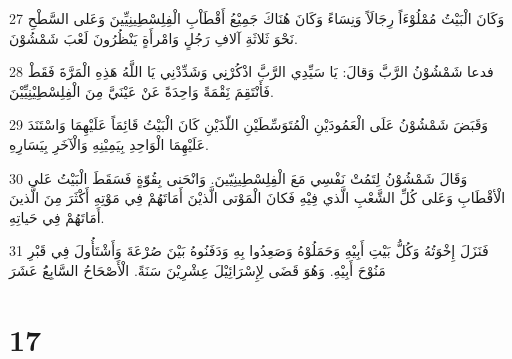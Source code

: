 \par 27 وَكَانَ الْبَيْتُ مُمْلُوْءَاً رِجَالَاً وَنِسَاءً وَكَانَ هُنَاكَ جَمِيْعُ أَقْطَاْبِ الْفِلِسْطِينِيِّينَ وَعَلى السَّطْحِ نَحْوَ ثَلاثَةِ آلافِ رَجُلٍ وَامْرأَةٍ يَنْظُرُونَ لَعْبَ شَمْشُوْنَ.
\par 28 فدعا شَمْشُوْنُ الرَّبَّ وَقالَ: يَا سَيِّدِي الرَّبَّ اذْكُرْنِِي وَشَدِّدْنِي يَا اللَّهُ هَذِهِ الْمَرَّةَ فَقَطْ فَأَنْتَقِمَ نَِقْمَةً وَاحِدَةً عَنْ عَيْنَيَّ مِنَ الْفِلِسْطِيْنِيِّيْنَ.
\par 29 وَقَبَضَ شَمْشُوْنُ عَلَى الْعَمُودَيْنِ الْمُتَوَسِّطَيْنِ اللّذَيْنِ كَانَ الْبَيْتُ قَائِمَاً عَلَيْهِمَا وَاسْتَنَدَ عَلَيْهِمَا الْوَاحِدِ بِيَمِيْنِهِ وَالْآخَرِ بِيَسَارِهِ.
\par 30 وَقَالَ شَمْشُوْنُ لِتَمُتْ نَفْسِي مَعَ الْفِلِسْطِينِيّينَ. وَانْحَنى بِقُوّةٍ فَسَقَطَ الْبَيْتُ عَلى الْأقْطَابِ وَعَلى كُلِّ الشَّعْبِ الَّذي فِيْهِ فَكانَ الْمَوْتى الَّذيْنَ أَمَاتَهُمْ فِي مَوْتِهِ أَكْثَرَ مِنَ الَّذينَ أَمَاتَهُمْ فِي حَياتِهِ.
\par 31 فَنَزَلَ إِخْوَتُهُ وَكُلُّ بَيْتِ أَبِيْهِ وَحَمَلُوْهُ وَصَعِدُوا بِهِ وَدَفَنُوهُ بَيْنَ صُرْعَةَ وَأَشْتَأُولَ فِي قَبْرِ مَنُوْحَ أَبِيْهِ. وَهُوَ قَضَى لِإِسْرَائِيْلَ عِشْرِيْنَ سَنَةً. الْأَصْحَاحُ السَّابِعَُ عَشَرَ

\chapter{17}

